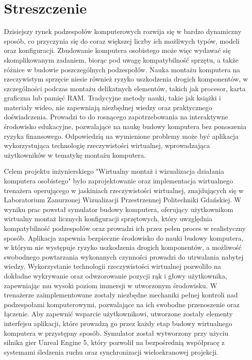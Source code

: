 \chapter*{Streszczenie}
\thispagestyle{plain}

Dzisiejszy rynek podzespołów komputerowych rozwija się w bardzo dynamiczny sposób, co przyczynia się do coraz większej liczby ich możliwych typów, modeli oraz konfiguracji.
Zbudowanie komputera osobistego może więc wydawać się skomplikowanym zadaniem, biorąc pod uwagę kompatybilność sprzętu, a także różnice w budowie poszczególnych podzespołów.
Nauka montażu komputera na rzeczywistym sprzęcie niesie również ryzyko uszkodzenia drogich komponentów, w szczególności podczas montażu delikatnych elementów, takich jak procesor, karta graficzna lub pamięć RAM.
Tradycyjne metody nauki, takie jak książki i materiały wideo, nie zapewniają niezbędnej wiedzy oraz praktycznego doświadczenia.
Prowadzi to do rosnącego zapotrzebowania na interaktywne środowisko edukacyjne, pozwalające na naukę budowy komputera bez ponoszenia ryzyka finansowego.
Odpowiedzią na wymienione problemy może być aplikacja wykorzystująca technologię rzeczywistości wirtualnej, wprowadzająca użytkowników w tematykę montażu komputera.

Celem projektu inżynierskiego "Wirtualny montaż i wizualizacja działania komputera osobistego" było zaprojektowanie oraz implementacja wirtualnego trenażera operującego w jaskiniach rzeczywistości wirtualnej, znajdujących się w Laboratorium Zanurzonej Wizualizacji Przestrzennej Politechniki Gdańskiej.
W wyniku prac powstał symulator budowy komputera, oferujący użytkownikom wirtualny montaż licznych konfiguracji sprzętowych, który uwzględnia kompatybilność podzespołów oraz prowadzi ich przez pełen proces w realistyczny sposób.
Aplikacja zapewnia bezpieczne środowisko do nauki budowy komputera, w którym nie występuje ryzyko uszkodzenia drogich komponentów, a możliwość swobodnego powtarzania wykonanych czynności prowadzi do utrwalania nabytej wiedzy.
Wykorzystanie technologii rzeczywistości wirtualnej pozwoliło na dokładne wykrywanie oraz odwzorowanie pozycji rąk i głowy użytkownika, zapewniając mu wysoki poziom immersji w utworzonym środowisku.
W trenażerze zaimplementowane zostały niezbędne mechaniki pełnej kontroli nad podzespołami komputerowymi, pozwalające na ich swobodne przenoszenie oraz łączenie.
Aby zapewnić wsparcie użytkownikowi, utworzone zostały elementy interfejsu aplikacji, które prowadzą go przez każdy etap budowy wirtualnego komputera w przystępny sposób.
Symulator został wytworzony przy użyciu silnika gier Unreal Engine 5, który pozwolił na bezpośrednią współpracę z systemami śledzenia ruchu oraz synchronizacji wieloekranowej projekcji.

